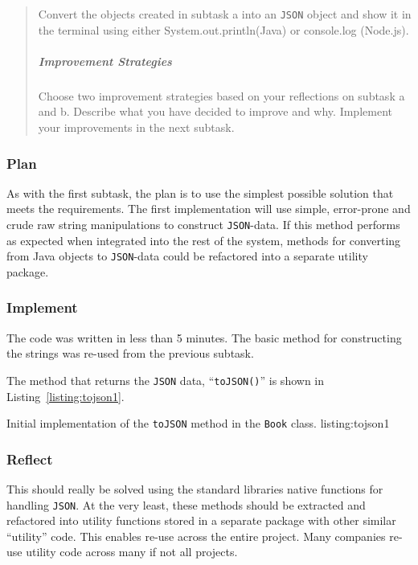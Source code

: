 \begin{quote}
  Convert the objects created in subtask a into an \texttt{JSON} object and show it in
  the terminal using either System.out.println(Java) or console.log (Node.js).

  \subparagraph{Improvement Strategies}

  Choose two improvement strategies based on your reflections on subtask a and
  b. Describe what you have decided to improve and why. Implement your
  improvements in the next subtask.
\end{quote}


\subsubsection{Plan}\label{task-1b-plan}
As with the first subtask, the plan is to use the simplest possible solution
that meets the requirements.
The first implementation will use simple, error-prone and crude raw string
manipulations to construct \texttt{JSON}-data.
If this method performs as expected when integrated into the rest of the system,
methods for converting from Java objects to \texttt{JSON}-data could be refactored into
a separate utility package.


\subsubsection{Implement}\label{task-1b-implement}
The code was written in less than 5 minutes. The basic method for
constructing the strings was re-used from the previous subtask.

The method that returns the \texttt{JSON} data, ``\texttt{toJSON()}'' is shown
in Listing~\ref{listing:tojson1}.

           {Initial implementation of the \texttt{toJSON\(\)} method in the
            \texttt{Book} class.}
           {listing:tojson1}


\subsubsection{Reflect}\label{task-1b-reflect}
This should really be solved using the standard libraries native functions for
handling \texttt{JSON}.
At the very least, these methods should be extracted and refactored into
utility functions stored in a separate package with other similar ``utility''
code.  This enables re-use across the entire project. Many companies re-use
utility code across many if not all projects.


